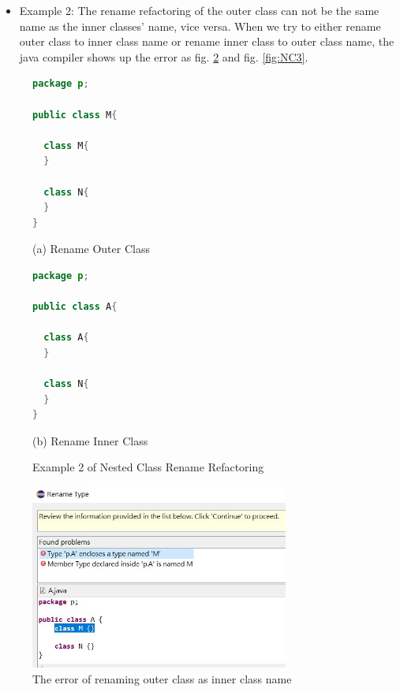 \begin{itemize}
\item Example 2: The rename refactoring of the outer class can not be the same name as the inner classes' name, vice versa. When we try to either rename outer class to inner class name or rename inner class to outer class name, the java compiler shows up the error as fig. \ref{fig:NC2} and fig. \ref{fig:NC3}.
\end{itemize}

\begin{figure}[th]
\centering
\begin{minipage}[t]{0.45\linewidth}
\begin{lstlisting}[language=java, basicstyle=\scriptsize\ttfamily,frame=single]
package p;

public class M{	
  
  class M{
  }
	
  class N{
  }
} 
\end{lstlisting}
\tiny{(a) Rename Outer Class}
\end{minipage}
\hfill
\begin{minipage}[t]{0.45\linewidth}
\begin{lstlisting}[language=java, basicstyle=\scriptsize\ttfamily,frame=single]
package p;

public class A{	
    
  class A{
  }
    
  class N{
  }
} 
\end{lstlisting}
\tiny{(b) Rename Inner Class}
\end{minipage}
\caption{Example 2 of Nested Class Rename Refactoring}
\label{fig:nestedclass2}
\end{figure}

\begin{figure}[H]
\centerline{\includegraphics[width=85mm,scale=0.5]{NC2.jpg}}
\caption{The error of renaming outer class as inner class name}
\label{fig:NC2}
\end{figure}


